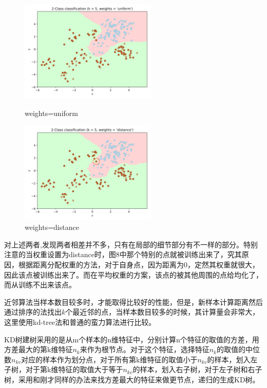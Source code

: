 \documentclass{article}
\newcommand{\hs}{\hspace{2em}}
\begin{document}
\begin{figure}[htbp]
	\begin{minipage}[b]{.5\linewidth}
		\centering
		\includegraphics[width=6.5cm]{img//fig4.png}
		\caption{weights=uniform}
	\end{minipage}%
	\begin{minipage}[b]{.5\linewidth}
	\centering
	\includegraphics[width=6.5cm]{img//fig10.png}
	\caption{weights=distance}
\end{minipage}%
\end{figure}


\hs 对上述两者,发现两者相差并不多，只有在局部的细节部分有不一样的部分。特别注意的当权重设置为distance时，图8中那个特别的点就被训练出来了，究其原因，根据距离分配权重的方法，对于自身点，因为距离为0，定然其权重就很大，因此该点被训练出来了。而在平均权重的方案，该点的被其他周围的点给均化了，而从训练不出来该点。\\


{}

\hs 近邻算法当样本数目较多时，才能取得比较好的性能，但是，新样本计算距离然后通过排序的法找出$k$个最近邻的点，当样本数目较多的时候，其计算量会非常大，这里使用kd-tree法和普通的蛮力算法进行比较。

\hs KD树建树采用的是从m个样本的n维特征中，分别计算n个特征的取值的方差，用方差最大的第k维特征$n_k$来作为根节点。对于这个特征，选择特征$n_k$的取值的中位数$n_{kv}$对应的样本作为划分点，对于所有第k维特征的取值小于$n_{kv}$的样本，划入左子树，对于第k维特征的取值大于等于$n_{kv}$的样本，划入右子树，对于左子树和右子树，采用和刚才同样的办法来找方差最大的特征来做更节点，递归的生成KD树。
\end{document}
